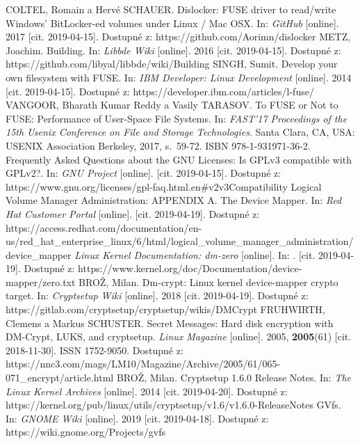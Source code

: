 \documentclass[a4paper,12pt]{article}
\begin{document}
{
COLTEL, Romain a Hervé SCHAUER. Dislocker: FUSE driver to read/write Windows' BitLocker-ed volumes under Linux / Mac OSX. In: \textit{GitHub} [online]. 2017 [cit. 2019-04-15]. Dostupné z: https://github.com/Aorimn/dislocker
METZ, Joachim. Building. In: \textit{Libbde Wiki} [online]. 2016 [cit. 2019-04-15]. Dostupné z: https://github.com/libyal/libbde/wiki/Building
SINGH, Sumit. Develop your own filesystem with FUSE. In: \textit{IBM Developer: Linux Development} [online]. 2014 [cit. 2019-04-15]. Dostupné z: https://developer.ibm.com/articles/l-fuse/
VANGOOR, Bharath Kumar Reddy a Vasily TARASOV. To FUSE or Not to FUSE: Performance of User-Space File Systems. In: \textit{FAST'17 Proceedings of the 15th Usenix Conference on File and Storage Technologies}. Santa Clara, CA, USA: USENIX Association Berkeley, 2017, s.~59-72. ISBN 978-1-931971-36-2.
Frequently Asked Questions about the GNU Licenses: Is GPLv3 compatible with GPLv2?. In: \textit{GNU Project} [online]. [cit. 2019-04-15]. Dostupné z: https://www.gnu.org/licenses/gpl-faq.html.en\#v2v3Compatibility
Logical Volume Manager Administration: APPENDIX A. The Device Mapper. In: \textit{Red Hat Customer Portal} [online]. [cit. 2019-04-19]. Dostupné z: https://access.redhat.com/documentation/en-us/red\_hat\_enterprise\_linux/6/html/logical\_volume\_manager\_administration/\\device\_mapper
\textit{Linux Kernel Documentation: dm-zero} [online]. In: . [cit. 2019-04-19]. Dostupné z: https://www.kernel.org/doc/Documentation/device-mapper/zero.txt
BROŽ, Milan. Dm-crypt: Linux kernel device-mapper crypto target. In: \textit{Cryptsetup Wiki} [online]. 2018 [cit. 2019-04-19]. Dostupné z: https://gitlab.com/cryptsetup/cryptsetup/wikis/DMCrypt
FRUHWIRTH, Clemens a Markus SCHUSTER. Secret Messages: Hard disk encryption with DM-Crypt, LUKS, and cryptsetup. \textit{Linux Magazine} [online]. 2005, \textbf{2005}(61) [cit. 2018-11-30]. ISSN 1752-9050. Dostupné z: https://nnc3.com/mags/LM10/Magazine/Archive/2005/61/065-071\_encrypt/article.html
BROŽ, Milan. Cryptsetup 1.6.0 Release Notes. In: \textit{The Linux Kernel Archives} [online]. 2014 [cit. 2019-04-20]. Dostupné z: https://kernel.org/pub/linux/utils/cryptsetup/v1.6/v1.6.0-ReleaseNotes
GVfs. In: \textit{GNOME Wiki} [online]. 2019 [cit. 2019-04-18]. Dostupné z: https://wiki.gnome.org/Projects/gvfs
}
\end{document}

